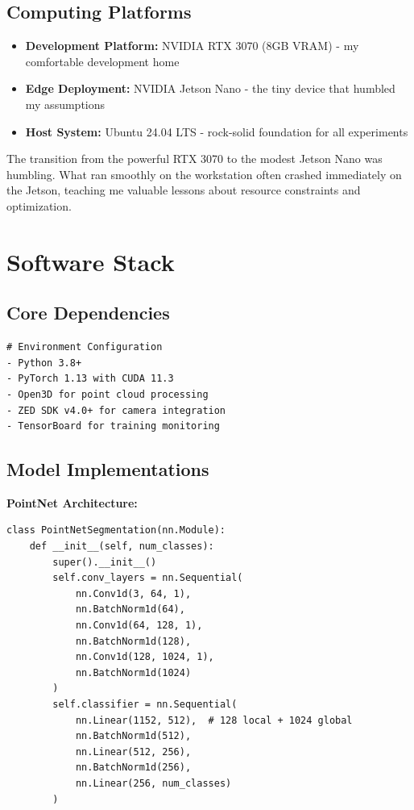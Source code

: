 \documentclass[12pt,a4paper]{report}
\begin{document}
\subsection{Computing Platforms}

\begin{itemize}
    \item \textbf{Development Platform:} NVIDIA RTX 3070 (8GB VRAM) - my comfortable development home
    \item \textbf{Edge Deployment:} NVIDIA Jetson Nano - the tiny device that humbled my assumptions
    \item \textbf{Host System:} Ubuntu 24.04 LTS - rock-solid foundation for all experiments
\end{itemize}

The transition from the powerful RTX 3070 to the modest Jetson Nano was humbling. What ran smoothly on the workstation often crashed immediately on the Jetson, teaching me valuable lessons about resource constraints and optimization.

\section{Software Stack}

\subsection{Core Dependencies}

\begin{lstlisting}[caption=Environment Configuration, label=lst:env]
# Environment Configuration
- Python 3.8+
- PyTorch 1.13 with CUDA 11.3
- Open3D for point cloud processing
- ZED SDK v4.0+ for camera integration
- TensorBoard for training monitoring
\end{lstlisting}

\subsection{Model Implementations}

\textbf{PointNet Architecture:}

\begin{lstlisting}[caption=PointNet Implementation, label=lst:pointnet]
class PointNetSegmentation(nn.Module):
    def __init__(self, num_classes):
        super().__init__()
        self.conv_layers = nn.Sequential(
            nn.Conv1d(3, 64, 1),
            nn.BatchNorm1d(64),
            nn.Conv1d(64, 128, 1),
            nn.BatchNorm1d(128),
            nn.Conv1d(128, 1024, 1),
            nn.BatchNorm1d(1024)
        )
        self.classifier = nn.Sequential(
            nn.Linear(1152, 512),  # 128 local + 1024 global
            nn.BatchNorm1d(512),
            nn.Linear(512, 256),
            nn.BatchNorm1d(256),
            nn.Linear(256, num_classes)
        )
\end{lstlisting}
\end{document}
